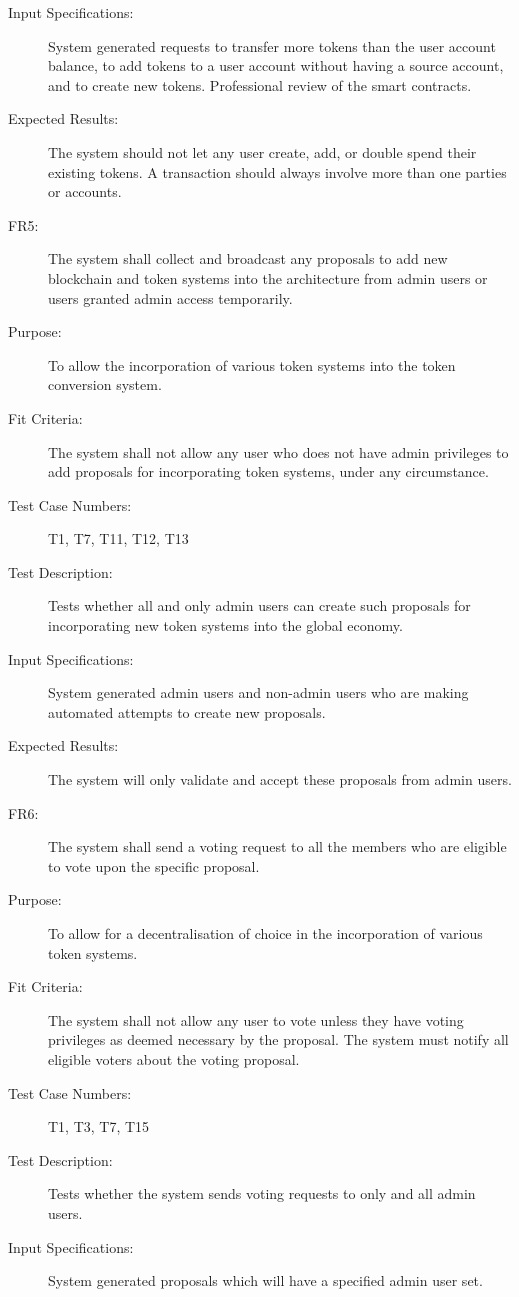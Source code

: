 \documentclass[a4paper,twoside,phd]{BYUPhys}
\begin{document}
\begin{description}
\item[Input Specifications:] System generated requests to transfer more tokens than the user account balance, to add tokens to a user account without having a source account, and to create new tokens. Professional review of the smart contracts.
\item[Expected Results:] The system should not let any user create, add, or double spend their existing tokens. A transaction should always involve more than one parties or accounts.
\\
\item[FR5:] The system shall collect and broadcast any proposals to add new blockchain and token systems into the architecture from admin users or users granted admin access temporarily.
\item[Purpose:] To allow the incorporation of various token systems into the token conversion system.
\item[Fit Criteria:] The system shall not allow any user who does not have admin privileges to add proposals for incorporating token systems, under any circumstance.
\item[Test Case Numbers:] T1, T7, T11, T12, T13
\item[Test Description:] Tests whether all and only admin users can create such proposals for incorporating new token systems into the global economy.
\item[Input Specifications:] System generated admin users and non-admin users who are making automated attempts to create new proposals.
\item[Expected Results:] The system will only validate and accept these proposals from admin users.
\\
\item[FR6:] The system shall send a voting request to all the members who are eligible to vote upon the specific proposal.
\item[Purpose:] To allow for a decentralisation of choice in the incorporation of various token systems.
\item[Fit Criteria:] The system shall not allow any user to vote unless they have voting privileges as deemed necessary by the proposal. The system must notify all eligible voters about the voting proposal.
\item[Test Case Numbers:] T1, T3, T7, T15
\item[Test Description:] Tests whether the system sends voting requests to only and all admin users.
\item[Input Specifications:] System generated proposals which will have a specified admin user set. 

\end{description}
\end{document}
